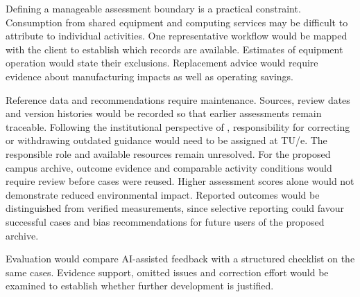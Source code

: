 \documentclass[11pt,a4paper]{article}
\begin{document}
Defining a manageable assessment boundary is a practical constraint. Consumption from shared equipment and computing services may be difficult to attribute to individual activities. One representative workflow would be mapped with the client to establish which records are available. Estimates of equipment operation would state their exclusions. Replacement advice would require evidence about manufacturing impacts as well as operating savings.

Reference data and recommendations require maintenance. Sources, review dates and version histories would be recorded so that earlier assessments remain traceable. Following the institutional perspective of \citet{hasselbalch2025sustainability}, responsibility for correcting or withdrawing outdated guidance would need to be assigned at TU/e. The responsible role and available resources remain unresolved. For the proposed campus archive, outcome evidence and comparable activity conditions would require review before cases were reused. Higher assessment scores alone would not demonstrate reduced environmental impact. Reported outcomes would be distinguished from verified measurements, since selective reporting could favour successful cases and bias recommendations for future users of the proposed archive.

Evaluation would compare AI-assisted feedback with a structured checklist on the same cases. Evidence support, omitted issues and correction effort would be examined to establish whether further development is justified.
\end{document}
